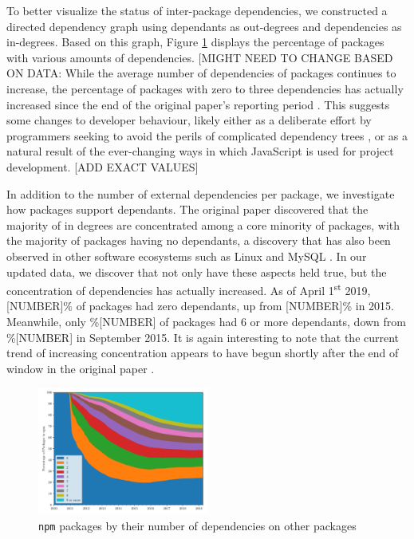 \documentclass[10pt,conference]{IEEEtran}
\def\code#1{\texttt{#1}}
\begin{document}
To better visualize the status of inter-package dependencies, we constructed
a directed dependency graph using dependants as out-degrees and
dependencies as in-degrees. Based on this graph, Figure \ref{outDegree}
displays the percentage of packages with various amounts of dependencies. 
[MIGHT NEED TO CHANGE BASED ON DATA: While the average number of dependencies 
of packages continues to increase, the percentage of packages with zero 
to three dependencies has actually increased since the end of the original paper's
reporting period \cite{Wittern:2016}. This suggests some changes to developer 
behaviour, likely either as a deliberate effort by programmers seeking to avoid the perils of 
complicated dependency trees \cite{Kikas:2017}, or as a natural result of the ever-changing
ways in which JavaScript is used for project development. [ADD EXACT VALUES]

In addition to the number of external dependencies per package, 
we investigate how packages support dependants. The original paper 
discovered that the majority of in degrees are concentrated among a core 
minority of packages, with the majority of packages having no dependants,
a discovery that has also been observed in other software ecosystems such
as Linux and MySQL \cite{Myers:2003}. In our updated data, we discover 
that not only have these aspects held true, but the concentration of 
dependencies has actually increased. As of April 1\textsuperscript{st} 2019, [NUMBER]\% of packages
had zero dependants, up from [NUMBER]\% in 2015. Meanwhile, only \%[NUMBER] of packages
had 6 or more dependants, down from \%[NUMBER] in September 2015. It is again interesting to note
that the current trend of increasing concentration appears to have begun shortly after the end of window in the original
paper \cite{Wittern:2016}.

\begin{figure}
  \includegraphics[width=0.5\textwidth]{figures/npm_deps_monthly_out_degree.pdf}
  \caption{\code{npm} packages by their number of dependencies on other packages}
  \label{outDegree}
\end{figure}
\end{document}
